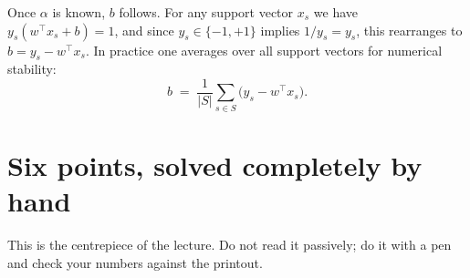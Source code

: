 \documentclass[11pt]{article}
\begin{document}
Once $\alpha$ is known, $b$ follows. For any support vector $x_s$ we have
$y_s(w^\top x_s + b) = 1$, and since $y_s \in \{-1, +1\}$ implies
$1/y_s = y_s$, this rearranges to $b = y_s - w^\top x_s$. In practice one
averages over all support vectors for numerical stability:
\begin{equation}
  b \;=\; \frac{1}{|S|}\sum_{s \in S}\bigl(y_s - w^\top x_s\bigr) .
  \label{eq:bias}
\end{equation}

\section{Six points, solved completely by hand}
\label{sec:hand}

This is the centrepiece of the lecture. Do not read it passively; do it with a
pen and check your numbers against the printout.
\end{document}
